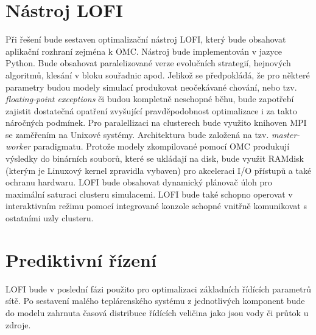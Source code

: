 \section{Nástroj LOFI}
\label{sec:tool_LOFI}
Při řešení bude sestaven optimalizační nástroj LOFI, který bude obsahovat
aplikační rozhraní zejména k OMC. Nástroj bude implementován v jazyce Python.
Bude obsahovat paralelizované verze evolučních strategií, hejnových algoritmů,
klesání v bloku souřadnic apod. Jelikož se předpokládá, že pro některé
parametry budou modely simulací produkovat neočekávané chování, nebo tzv.
\textit{floating-point exceptions} či budou kompletně neschopné běhu, bude
zapotřebí zajistit dostatečná opatření zvyšující pravděpodobnost optimalizace i
za takto náročných podmínek. Pro paralellizaci na clusterech bude využito
knihoven MPI se zaměřením na Unixové systémy. Architektura bude založená na
tzv. \textit{master-worker} paradigmatu. Protože modely zkompilované
pomocí OMC produkují výsledky do binárních souborů, které se ukládají na disk,
bude využit RAMdisk (kterým je Linuxový kernel zpravidla vybaven) pro
akceleraci I/O přístupů a také ochranu hardwaru. LOFI bude obsahovat dynamický
plánovač úloh pro maximální saturaci clusteru simulacemi. LOFI bude také
schopno operovat v interaktivním režimu pomocí integrované konzole schopné
vnitřně komunikovat s ostatními uzly clusteru.
\section{Prediktivní řízení}
\label{sec:MPC}
LOFI bude v poslední fázi použito pro optimalizaci základních řídících
parametrů sítě. Po sestavení malého teplárenského systému z jednotlivých
komponent bude do modelu zahrnuta časová distribuce řídících veličina jako jsou
vody či průtok u zdroje.

